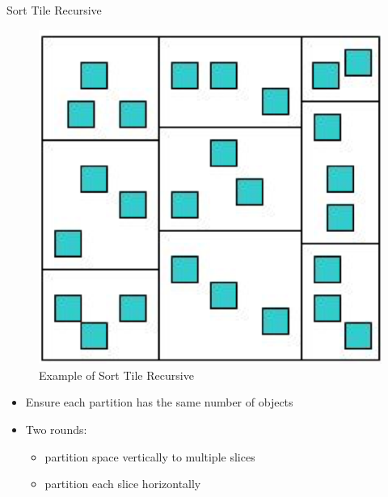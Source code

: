 \documentclass[xcolor={dvipsnames},aspectratio=169,10pt]{beamer}
\begin{document}
\begin{frame}{Sort Tile Recursive~\cite{10.1109/ICDE.1997.582015}}
  \begin{figure}
    \includegraphics[height=0.4\textheight]{figs/knn/str.png}
    \caption{Example of Sort Tile Recursive}
  \end{figure}

  \begin{itemize}
    \item Ensure each partition has the same number of objects
    \item Two rounds:
      \begin{itemize}
        \item partition space vertically to multiple slices
        \item partition each slice horizontally
      \end{itemize}
  \end{itemize}
\end{frame}
\end{document}
